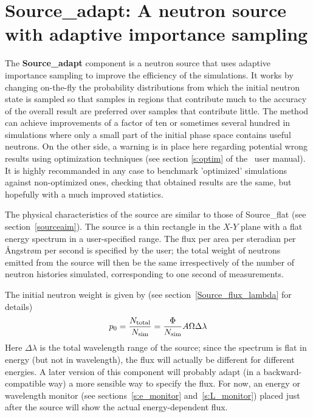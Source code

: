 
\section{Source\_adapt: A neutron source with adaptive importance sampling}
\label{s:Source_adapt}
\label{s:source-adapt}

The {\bf Source\_adapt} component is a neutron source that uses adaptive
importance sampling to improve the efficiency of the simulations. It
works by changing on-the-fly the probability distributions from which
the initial neutron state is sampled so that samples in regions that
contribute much to the accuracy of the overall result are preferred over
samples that contribute little. The method can achieve improvements of a
factor of ten or sometimes several hundred in simulations where only a
small part of the initial phase space contains useful neutrons.
On the other side, a warning is in place here regarding potential wrong results using optimization techniques (see section \ref{s:optim} of the \MCS\ user manual). It is highly recommanded in any case to benchmark 'optimized' simulations against non-optimized ones, checking that obtained results are the same, but hopefully with a much improved statistics.

The physical characteristics of the source are similar to those of
Source\_flat (see section~\ref{sourceaim}). The source is a thin
rectangle in the $X$-$Y$ plane with a flat energy spectrum in a
user-specified range. The flux per area per steradian per
{\AA}ngstr{\o}m per second is specified by the user; the total weight of
neutrons emitted from the source will then be the same irrespectively of
the number of neutron histories simulated, corresponding to one second
of measurements.

The initial neutron weight is given by (see
section~\ref{Source_flux_lambda} for details)
$$ p_0 = \frac{N_{\rm total}}{N_{\rm sim}} =
    \frac{\Phi}{N_{\rm sim}} A \Omega \Delta\lambda $$
Here $\Delta\lambda$ is the total wavelength range of the source; since
the spectrum is flat in energy (but not in wavelength), the flux
will actually be different for different energies. A later version of
this component will probably adapt (in a backward-compatible way) a more
sensible way to specify the flux. For now, an energy or wavelength
monitor (see sections~\ref{s:e_monitor} and~\ref{s:L_monitor}) placed
just after the source will show the actual energy-dependent flux.


